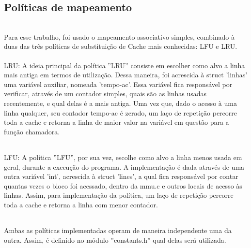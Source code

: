 \documentclass{article}
\begin{document}
\subsection{Políticas de mapeamento}
\\ Para esse trabalho, foi usado o mapeamento associativo simples, combinado à duas das três políticas de substituição de Cache mais conhecidas: LFU e LRU.\\
\\LRU: A ideia principal da política ''LRU'' consiste em escolher como alvo a linha mais antiga em termos de utilização. Dessa maneira, foi acrescida à struct 'linhas' uma variável auxiliar, nomeada 'tempo-ac'. Essa variável fica responsável por verificar, através de um contador simples, quais são as linhas usadas recentemente, e qual delas é a mais antiga. Uma vez que, dado o acesso à uma linha qualquer, seu contador tempo-ac é zerado, um laço de repetição percorre toda a cache e retorna a linha de maior valor na variável em questão para a função chamadora.  

\\LFU: A política ''LFU'', por sua vez, escolhe como alvo a linha menos usada em geral, durante a execução do programa. A implementação é dada através de uma outra variável 'int', acrescida à struct 'lines', a qual fica responsável por contar quantas vezes o bloco foi acessado, dentro da mmu.c e outros locais de acesso às linhas. Assim, para implementação da política, um laço de repetição percorre toda a cache e retorna a linha com menor contador.

\\Ambas as políticas implementadas operam de maneira independente uma da outra. Assim, é definido no módulo ''constants.h'' qual delas será utilizada.

\\ 
\clearpage
\end{document}
